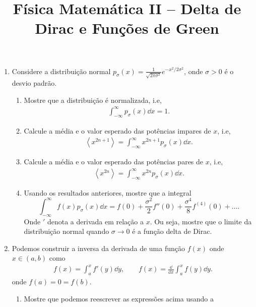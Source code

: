 \newif\ifuseseminar
\useseminartrue


\title{Física Matemática II -- Delta de Dirac e Funções de Green}


\begin{enumerate}
	\item Considere a distribuição normal
	      $p_\sigma(x)=\frac{1}{\sqrt{2\pi\sigma^2}}e^{-x^2/2\sigma^2}$, onde $\sigma>0$
	      é o desvio padrão.
	      \begin{enumerate}
		      \item Mostre que a distribuição é normalizada, i.e,
		            \begin{align}
			            \int_{-\infty}^{\infty}p_\sigma(x)\dd x = 1.
		            \end{align}
		      \item Calcule a média e o valor esperado das potências impares de $x$,
		            i.e,
		            \begin{align}
			            \left\langle x^{2n+1}\right\rangle =
			            \int_{-\infty}^{\infty}x^{2n+1}p_\sigma(x)\dd x.
		            \end{align}
		      \item Calcule a média e o valor esperado das potências pares de $x$,
		            i.e,
		            \begin{align}
			            \left\langle x^{2n}\right\rangle =
			            \int_{-\infty}^{\infty}x^{2n}p_\sigma(x)\dd x.
		            \end{align}
		      \item Usando os resultados anteriores, mostre que a integral
		            $$\int_{-\infty}^{\infty}f(x)p_\sigma(x)\dd x =
			            f(0)+\frac{\sigma^2}{2}f''(0) +
			            \frac{\sigma^4}{8}f^{(4)}(0)+\ldots.$$
		            Onde ${}'$ denota a derivada em relação a $x$.
		            Ou seja, mostre que o limite da distribuição normal quando
		            $\sigma\rightarrow 0$ é a função delta de Dirac.
	      \end{enumerate}
	\item Podemos construir a inversa da derivada de uma função $f(x)$ onde $x\in(a, b)$
	      como
	      \begin{align}
		      f(x) = \int_{a}^{x}f'(y)\dd y,\qquad f(x) = \frac{\dd}{\dd x}\int_{a}^{x}f(y)\dd y.
	      \end{align}
	      onde $f(a) = 0 = f(b)$.
	      \begin{enumerate}
		      \item Mostre que podemos reescrever as expressões acima usando a

\end{enumerate}
\end{enumerate}

